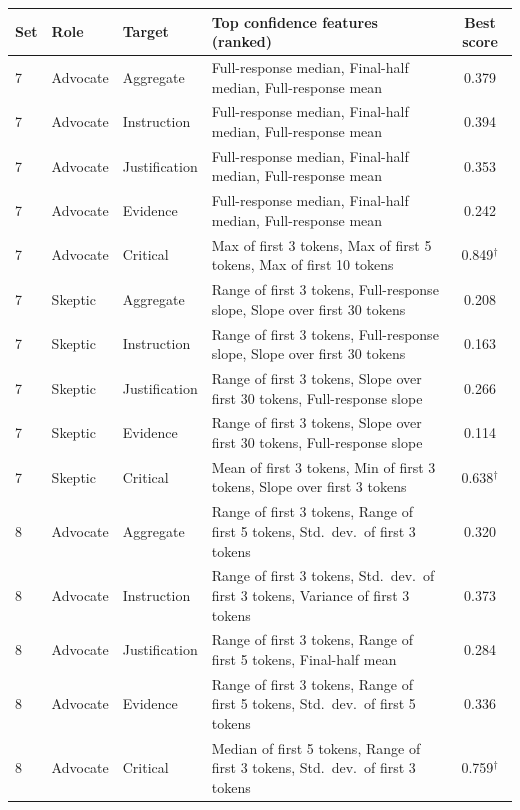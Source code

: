 \documentclass[11pt]{article}
\begin{document}
\begin{table}[t]
\centering
\small
\begin{tabular}{l l l l c}
\toprule
Set & Role & Target & Top confidence features (ranked) & Best score \\
\midrule
7 & Advocate & Aggregate     & Full-response median, Final-half median, Full-response mean & 0.379 \\
7 & Advocate & Instruction   & Full-response median, Final-half median, Full-response mean & 0.394 \\
7 & Advocate & Justification & Full-response median, Final-half median, Full-response mean & 0.353 \\
7 & Advocate & Evidence      & Full-response median, Final-half median, Full-response mean & 0.242 \\
7 & Advocate & Critical      & Max of first 3 tokens, Max of first 5 tokens, Max of first 10 tokens & 0.849$^\dagger$ \\
\midrule
7 & Skeptic  & Aggregate     & Range of first 3 tokens, Full-response slope, Slope over first 30 tokens & 0.208 \\
7 & Skeptic  & Instruction   & Range of first 3 tokens, Full-response slope, Slope over first 30 tokens & 0.163 \\
7 & Skeptic & Justification & Range of first 3 tokens, Slope over first 30 tokens, Full-response slope & 0.266 \\
7 & Skeptic  & Evidence      & Range of first 3 tokens, Slope over first 30 tokens, Full-response slope & 0.114 \\
7 & Skeptic  & Critical      & Mean of first 3 tokens, Min of first 3 tokens, Slope over first 3 tokens & 0.638$^\dagger$ \\
\midrule
8 & Advocate & Aggregate     & Range of first 3 tokens, Range of first 5 tokens, Std.\ dev.\ of first 3 tokens & 0.320 \\
8 & Advocate & Instruction   & Range of first 3 tokens, Std.\ dev.\ of first 3 tokens, Variance of first 3 tokens & 0.373 \\
8 & Advocate & Justification & Range of first 3 tokens, Range of first 5 tokens, Final-half mean & 0.284 \\
8 & Advocate & Evidence      & Range of first 3 tokens, Range of first 5 tokens, Std.\ dev.\ of first 5 tokens & 0.336 \\
8 & Advocate & Critical      & Median of first 5 tokens, Range of first 3 tokens, Std.\ dev.\ of first 3 tokens & 0.759$^\dagger$ \\

\end{tabular}
\end{table}
\end{document}

